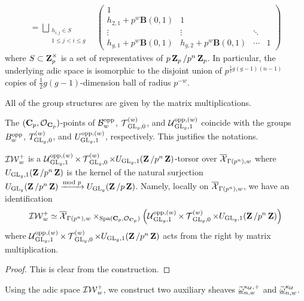 \begin{Definition}
\begin{enumerate}
\begin{align*}
=\bigsqcup_{\substack{h_{i,j}\in S\\1\leq j<i\leq g}}&\begin{pmatrix}1 \\ h_{2,1}+p^w\mathbf{B}(0,1) & 1\\ \vdots & \vdots &  \ddots\\ h_{g,1}+p^w\mathbf{B}(0,1) & h_{g,2}+p^w\mathbf{B}(0,1) & \cdots & 1\end{pmatrix}
\end{align*}
where $S\subset \Z_p^{\times}$ is a set of representatives of $p\Z_p/p^n\Z_p$. In particular, the underlying adic space is isomorphic to the disjoint union of $p^{\frac{1}{2}g(g-1)(n-1)}$ copies of $\frac{1}{2}g(g-1)$-dimension ball of radius $p^{-w}$.

\end{enumerate}
All of the group structures are given by the matrix multiplications.
\end{Definition}

\begin{Remark}
\normalfont The $(\C_p, \calO_{\C_p})$-points of $\calB^{\opp}_w$, $\calT_{\GL_g,0}^{(w)}$, and $\calU^{\opp, (w)}_{\GL_g,1}$ coincide with the groups $B^{\opp}_w$, $T^{(w)}_{\GL_g, 0}$, and $U^{\opp, (w)}_{\GL_g,1}$, respectively. This justifies the notations.
\end{Remark}

\begin{Lemma}
$\adicIW^+_w$ is a $\calU^{\opp, (w)}_{\GL_g,1}\times\calT_{\GL_g,0}^{(w)}\times U_{\GL_g,1}(\Z/p^n\Z)$-torsor over $\overline{\calX}_{\Gamma(p^n),w}$ where $U_{\GL_g,1}(\Z/p^n\Z)$ is the kernel of the natural surjection $U_{\GL_g}(\Z/p^n\Z)\xrightarrow[]{\mathrm{mod}\,\,p}U_{\GL_g}(\Z/p\Z)$. Namely, locally on $\overline{\calX}_{\Gamma(p^n),w}$, we have an identification
$$\adicIW^+_w\simeq \overline{\calX}_{\Gamma(p^n),w}\times_{\Spa(\C_p, \calO_{\C_p})}\left(\calU^{\opp, (w)}_{\GL_g,1}\times\calT_{\GL_g,0}^{(w)}\times U_{\GL_g,1}(\Z/p^n\Z)\right)$$ where $\calU^{\opp, (w)}_{\GL_g,1}\times\calT_{\GL_g,0}^{(w)}\times U_{\GL_g,1}(\Z/p^n\Z)$ acts from the right by matrix multiplication.
\end{Lemma}

\begin{proof}
This is clear from the construction. 
\end{proof}

Using the adic space $\adicIW^+_w$, we construct two auxiliary sheaves $\widetilde{\underline{\omega}}^{\kappa_{\calU},+}_{n,w}$ and $\widetilde{\underline{\omega}}^{\kappa_{\calU}}_{n,w}$. 

